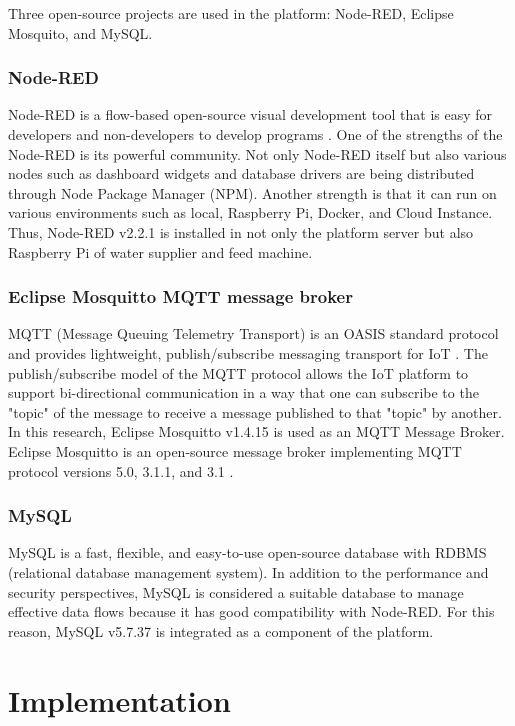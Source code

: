 \documentclass[conference]{IEEEtran}
\begin{document}
Three open-source projects are used in the platform: Node-RED, Eclipse Mosquito, and MySQL.

\subsubsection{Node-RED}
Node-RED is a flow-based open-source visual development tool that is easy for developers and non-developers to develop programs \cite{b17}.
One of the strengths of the Node-RED is its powerful community.
Not only Node-RED itself but also various nodes such as dashboard widgets and database drivers are being distributed through Node Package Manager (NPM).
Another strength is that it can run on various environments such as local, Raspberry Pi, Docker, and Cloud Instance.
Thus, Node-RED v2.2.1 is installed in not only the platform server but also Raspberry Pi of water supplier and feed machine.

\subsubsection{Eclipse Mosquitto MQTT message broker}
MQTT (Message Queuing Telemetry Transport) is an OASIS standard protocol and provides lightweight, publish/subscribe messaging transport for IoT \cite{b9}.
The publish/subscribe model of the MQTT protocol allows the IoT platform to support bi-directional communication in a way that one can subscribe to the "topic" of the message to receive a message published to that "topic" by another.
In this research, Eclipse Mosquitto v1.4.15 is used as an MQTT Message Broker.
Eclipse Mosquitto is an open-source message broker implementing MQTT protocol versions 5.0, 3.1.1, and 3.1 \cite{b20}.

\subsubsection{MySQL}
MySQL is a fast, flexible, and easy-to-use open-source database with RDBMS (relational database management system).
In addition to the performance and security perspectives, MySQL is considered a suitable database to manage effective data flows because it has good compatibility with Node-RED.
For this reason, MySQL v5.7.37 is integrated as a component of the platform.

\section{Implementation}
\end{document}
